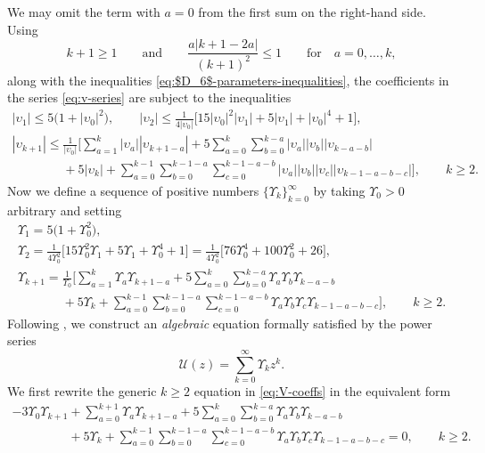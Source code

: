 \documentclass[pdftex]{sigma}
\numberwithin{equation}{section}
\begin{document}
We may omit the term with $a=0$ from the first sum on the right-hand side.
Using
\[
k+1\ge 1\qquad\text{and}\qquad \frac{a|k+1-2a|}{(k+1)^2}\le 1\qquad\text{for}\quad a=0,\dots,k,
\]
along with the inequalities \eqref{eq:$D_6$-parameters-inequalities}, the coefficients in the series \eqref{eq:v-series} are subject to the inequalities
\begin{gather}
 |\upsilon_1|\le 5\big(1+|\upsilon_0|^2\big),\qquad
 |\upsilon_2|\le \frac{1}{4|\upsilon_0|}\big[15|\upsilon_0|^2|\upsilon_1| + 5|\upsilon_1|+|\upsilon_0|^4 + 1\big],\nonumber\\
 |\upsilon_{k+1}|\le \frac{1}{|\upsilon_0|}\Bigg[\sum_{a=1}^k|\upsilon_a||\upsilon_{k+1-a}| +
 5\sum_{a=0}^k\sum_{b=0}^{k-a}|\upsilon_a||\upsilon_b||\upsilon_{k-a-b}|\nonumber\\
 \phantom{|\upsilon_{k+1}|\le}{}+5|\upsilon_k| + \sum_{a=0}^{k-1}\sum_{b=0}^{k-1-a}\sum_{c=0}^{k-1-a-b}
 |\upsilon_a||\upsilon_b||\upsilon_c||\upsilon_{k-1-a-b-c}|\Bigg],\qquad k\ge 2.
 \label{eq:xi-inequalities}
\end{gather}
Now we define a sequence of positive numbers $\{\Upsilon_k\}_{k=0}^\infty$ by taking $\Upsilon_0>0$ arbitrary and setting
\begin{gather}
 \Upsilon_1= 5\big(1+\Upsilon_0^2\big), \label{eq:V-coeffsU1}\\
 \Upsilon_2=\frac{1}{4\Upsilon_0^2}\big[15\Upsilon_0^2\Upsilon_1+5\Upsilon_1 + \Upsilon_0^4+1\big]=\frac{1}{4\Upsilon_0^2}\big[76\Upsilon_0^4 + 100\Upsilon_0^2 + 26\big], \label{eq:V-coeffsU2}\\
 \Upsilon_{k+1}=\frac{1}{\Upsilon_0}\Bigg[\sum_{a=1}^k\Upsilon_a\Upsilon_{k+1-a} + 5\sum_{a=0}^k\sum_{b=0}^{k-a}\Upsilon_a\Upsilon_b\Upsilon_{k-a-b}\nonumber\\
 \phantom{\Upsilon_{k+1}=}{}+5\Upsilon_k + \sum_{a=0}^{k-1}\sum_{b=0}^{k-1-a}\sum_{c=0}^{k-1-a-b}\Upsilon_a\Upsilon_b\Upsilon_c\Upsilon_{k-1-a-b-c}\Bigg],\qquad k\ge 2.
 \label{eq:V-coeffs}
\end{gather}
Following \cite[Proposition 1.1.1, p.\ 261]{Iwasaki_Kimura_Shimomura}, we construct an \emph{algebraic} equation formally satisfied by the power series
\begin{equation}
\mathcal{U}(z)=\sum_{k=0}^\infty\Upsilon_kz^k.
\label{eq:V-series}
\end{equation}
We first rewrite the generic $k\ge 2$ equation in \eqref{eq:V-coeffs} in the equivalent form
\begin{gather}
-3\Upsilon_0\Upsilon_{k+1} + \sum_{a=0}^{k+1}\Upsilon_a\Upsilon_{k+1-a} +
5\sum_{a=0}^k\sum_{b=0}^{k-a}\Upsilon_a\Upsilon_b\Upsilon_{k-a-b}\nonumber\\
\phantom{-3\Upsilon_0\Upsilon_{k+1} }{}+ 5\Upsilon_k +\sum_{a=0}^{k-1}\sum_{b=0}^{k-1-a}\sum_{c=0}^{k-1-a-b}\Upsilon_a\Upsilon_b\Upsilon_c\Upsilon_{k-1-a-b-c}=0,\qquad k\ge 2.
\label{eq:V-coeff-kge2}
\end{gather}
\end{document}
